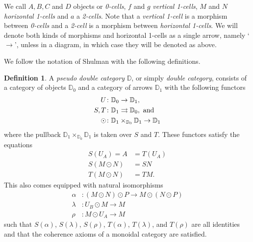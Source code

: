 \documentclass[11pt]{amsart}
\newcommand{\dblcat}[1]{\mathbb{#1}}
\renewcommand{\t}[1]{\textup{#1}}
\newcommand{\from}{\colon}
\theoremstyle{remark}
\theoremstyle{definition}
\newtheorem{defn}[thm]{Definition}
\begin{document}
We call $A, B, C$ and $D$ objects or \emph{0-cells}, $f$ and $g$ \emph{vertical 1-cells}, $M$ and $N$ \emph{horizontal 1-cells} and $a$ a \emph{2-cells}. Note that a \emph{vertical 1-cell} is a morphism between \emph{0-cells} and a \emph{2-cell} is a morphism between \emph{horizontal 1-cells}. We will denote both kinds of morphisms and horizontal 1-cells as a single arrow, namely `$\to$', unless in a diagram, in which case they will be denoted as above.

We follow the notation of Shulman \cite{Shul} with the following definitions.

%
\begin{defn}
	\label{def:DoubleCategory}
	A \emph{pseudo double category} $\dblcat{D}$, or simply \emph{double category}, consists of a category of objects $\dblcat{D}_{0}$ and a category of arrows $\dblcat{D}_{1}$ with the following functors
	\begin{equation*}
	\begin{split}
	U & \from \dblcat{D}_{0} \to \dblcat{D}_{1}, \\
	S,T & \from \dblcat{D}_{1} \rightrightarrows \dblcat{D}_{0}, \t{ and} \\
	\odot & \from \dblcat{D}_{1} \times_{\dblcat{D}_{0}} \dblcat{D}_{1} \to \dblcat{D}_{1}
	\end{split}
	\end{equation*}
	where the pullback $\dblcat{D}_{1} \times_{\dblcat{D}_{0}} \dblcat{D}_{1}$ is taken over $S$ and $T$.  These functors satisfy the equations
	\begin{equation*}
	\begin{split}
	S(U_{A}) = A &= T(U_{A}) \\
	S(M \odot N) & = SN \\
	T(M \odot N) & = TM. 
	\end{split}
	\end{equation*}
	This also comes equipped with natural isomorphisms
	\begin{equation*}
	\begin{split}
	\alpha & \from (M \odot N) \odot P \to M \odot (N \odot P)\\
	\lambda & \from U_{B} \odot M \to M\\
	\rho & \from M \odot U_{A} \to M
	\end{split}
	\end{equation*}
	such that $S(\alpha)$, $S(\lambda)$, $S(\rho)$, $T(\alpha)$, $T(\lambda)$, and $T(\rho)$ are all identities and that the coherence axioms of a monoidal category are satisfied. 
	

\end{defn}
\end{document}
